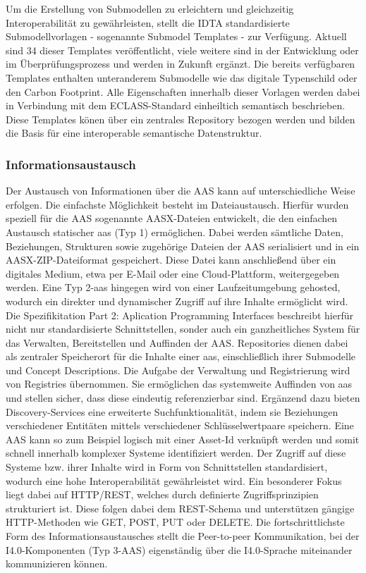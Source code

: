 Um die Erstellung von Submodellen zu erleichtern und gleichzeitig Interoperabilität zu gewährleisten, stellt die IDTA standardisierte Submodellvorlagen - sogenannte Submodel Templates - zur Verfügung.
Aktuell sind 34 dieser Templates veröffentlicht, viele weitere sind in der Entwicklung oder im Überprüfungsprozess und werden in Zukunft ergänzt.
Die bereits verfügbaren Templates enthalten unteranderem Submodelle wie das digitale Typenschild oder den Carbon Footprint.
Alle Eigenschaften innerhalb dieser Vorlagen werden dabei in Verbindung mit dem ECLASS-Standard einheiltich semantisch beschrieben.
Diese Templates könen über ein zentrales Repository bezogen werden und bilden die Basis für eine interoperable semantische Datenstruktur.

\subsubsection{Informationsaustausch}
Der Austausch von Informationen über die AAS kann auf unterschiedliche Weise erfolgen.
Die einfachste Möglichkeit besteht im Dateiaustausch. Hierfür wurden speziell für die AAS sogenannte AASX-Dateien \cite{SpezifikationPart5} entwickelt, die den einfachen Austausch statischer \acs{aas} (Typ 1) ermöglichen.
Dabei werden sämtliche Daten, Beziehungen, Strukturen sowie zugehörige Dateien der AAS serialisiert und in ein AASX-ZIP-Dateiformat gespeichert. Diese Datei kann anschließend über ein digitales Medium, etwa per E-Mail oder eine Cloud-Plattform, weitergegeben werden. 
Eine Typ 2-\acs{aas} hingegen wird von einer Laufzeitumgebung gehosted, wodurch ein direkter und dynamischer Zugriff auf ihre Inhalte ermöglicht wird. 
Die Spezifikitation Part 2: Aplication Programming Interfaces \cite{SpezifikationPart2} beschreibt hierfür nicht nur standardisierte Schnittstellen, sonder auch ein ganzheitliches System für das Verwalten, Bereitstellen und Auffinden der AAS.
Repositories dienen dabei als zentraler Speicherort für die Inhalte einer \acs{aas}, einschließlich ihrer Submodelle und Concept Descriptions.
Die Aufgabe der Verwaltung und Registrierung wird von Registries übernommen.
Sie ermöglichen das systemweite Auffinden von \acs{aas} und stellen sicher, dass diese eindeutig referenzierbar sind.
Ergänzend dazu bieten Discovery-Services eine erweiterte Suchfunktionalität, indem sie Beziehungen verschiedener Entitäten mittels verschiedener Schlüsselwertpaare speichern.
Eine AAS kann so zum Beispiel logisch mit einer Asset-Id verknüpft werden und somit schnell innerhalb komplexer Systeme identifiziert werden.
Der Zugriff auf diese Systeme bzw. ihrer Inhalte wird in Form von Schnittstellen standardisiert, wodurch eine hohe Interoperabilität gewährleistet wird.
Ein besonderer Fokus liegt dabei auf HTTP/REST, welches durch definierte Zugriffsprinzipien strukturiert ist. Diese folgen dabei dem REST-Schema und unterstützen gängige HTTP-Methoden wie GET, POST, PUT oder DELETE.
Die fortschrittlichste Form des Informationsaustausches stellt die Peer-to-peer Kommunikation, bei der I4.0-Komponenten (Typ 3-AAS) eigenständig über die I4.0-Sprache miteinander kommunizieren können.



